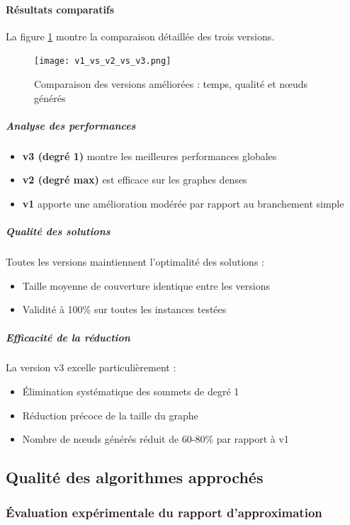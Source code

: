 \documentclass[11pt,a4paper]{article}
\begin{document}
\paragraph{Résultats comparatifs}

La figure \ref{fig:comparaison_versions} montre la comparaison détaillée des trois versions.

\begin{figure}[H]
  \centering
  \texttt{[image: v1\_vs\_v2\_vs\_v3.png]}
  \caption{Comparaison des versions améliorées : temps, qualité et nœuds générés}
  \label{fig:comparaison_versions}
\end{figure}

\subparagraph{Analyse des performances}
\begin{itemize}
  \item \textbf{v3 (degré 1)} montre les meilleures performances globales
  \item \textbf{v2 (degré max)} est efficace sur les graphes denses
  \item \textbf{v1} apporte une amélioration modérée par rapport au branchement simple
\end{itemize}

\subparagraph{Qualité des solutions}
Toutes les versions maintiennent l'optimalité des solutions :
\begin{itemize}
  \item Taille moyenne de couverture identique entre les versions
  \item Validité à 100\% sur toutes les instances testées
\end{itemize}

\subparagraph{Efficacité de la réduction}
La version v3 excelle particulièrement :
\begin{itemize}
  \item Élimination systématique des sommets de degré 1
  \item Réduction précoce de la taille du graphe
  \item Nombre de nœuds générés réduit de 60-80\% par rapport à v1
\end{itemize}

\subsection{Qualité des algorithmes approchés}

\subsubsection{Évaluation expérimentale du rapport d'approximation}
\end{document}
